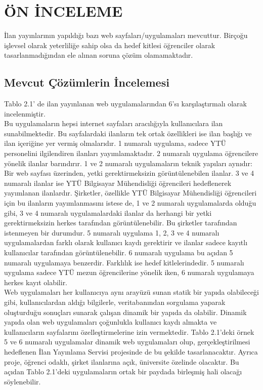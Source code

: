 \chapter{ÖN İNCELEME}
İlan yayınlarının yapıldığı bazı web sayfaları/uygulamaları mevcuttur. Birçoğu işlevsel
olarak yeterliliğe sahip olsa da hedef kitlesi öğrenciler olarak tasarlanmadığından ele
alınan soruna çözüm olamamaktadır.

\section{Mevcut Çözümlerin İncelemesi}
Tablo 2.1' de ilan yayınlanan web uygulamalarından 6'sı karşılaştırmalı olarak
incelenmiştir. \\
Bu uygulamaların hepsi internet sayfaları aracılığıyla kullanıcılara ilan sunabilmektedir.
Bu sayfalardaki ilanların tek ortak özellikleri ise ilan başlığı ve ilan içeriğine yer vermiş
olmalarıdır. 1 numaralı uygulama, sadece YTÜ personelini ilgilendiren ilanları
yayımlamaktadır. 2 numaralı uygulama öğrencilere yönelik ilanlar barındırır. 1 ve 2
numaralı uygulamaların teknik yapıları aynıdır: Bir web sayfası üzerinden, yetki
gerektirmeksizin görüntülenebilen ilanlar. 3 ve 4 numaralı ilanlar ise YTÜ Bilgisayar
Mühendisliği öğrencileri hedeflenerek yayımlanan ilanlardır. Şirketler, özellikle YTÜ
Bilgisayar Mühendisliği öğrencileri için bu ilanların yayımlanmasını istese de, 1 ve 2
numaralı uygulamalarda olduğu gibi, 3 ve 4 numaralı uygulamalardaki ilanlar da
herhangi bir yetki gerektirmeksizin herkes tarafından görüntülenebilir. Bu şirketler
tarafından istenmeyen bir durumdur. 5 numaralı uygulama 1, 2, 3 ve 4 numaralı
uygulamalardan farklı olarak kullanıcı kaydı gerektirir ve ilanlar sadece kayıtlı
kullanıcılar tarafından görüntülenebilir. 6 numaralı uygulama bu açıdan 5 numaralı
uygulamaya benzerdir. Farklılık ise hedef kitlelerindedir. 5 numaralı uygulama sadece
YTÜ mezun öğrencilerine yönelik iken, 6 numaralı uygulamaya herkes kayıt olabilir. \\
Web uygulamaları her kullanıcıya aynı arayüzü sunan statik bir yapıda olabileceği gibi,
kullanıcılardan aldığı bilgilerle, veritabanından sorgulama yaparak oluşturduğu
sonuçları sunarak çalışan dinamik bir yapıda da olabilir. Dinamik yapıda olan web
uygulamaları çoğunlukla kullanıcı kaydı almakta ve kullanıcıların sayfalarını
özelleştirmelerine izin vermektedir. Tablo 2.1’deki örnek 5 ve 6 numaralı uygulamalar
dinamik web uygulamaları olup, gerçekleştirilmesi hedeflenen İlan Yayınlama Servisi
projesinde de bu şekilde tasarlanacaktır. Ayrıca proje, öğrenci odaklı, şirket ilanlarına
açık, üniversite özelinde olacaktır. Bu açıdan Tablo 2.1’deki uygulamaların ortak bir
paydada birleşmiş hali olacağı söylenebilir.

